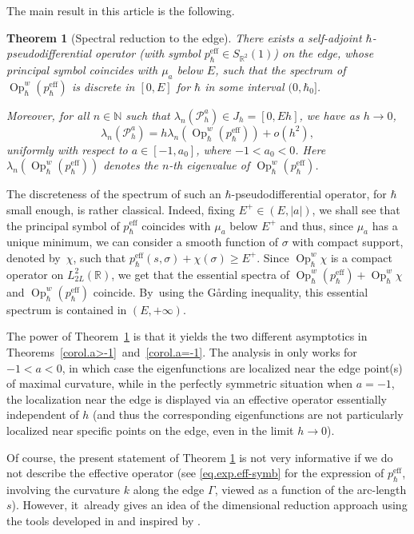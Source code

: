 \documentclass[JEP,XML,SOM,Unicode,NoFloatCountersInSection,published]{cedram}
\newcommand{\eff}{\mathrm{eff}}
\DeclareMathOperator{\Op}{Op}
\newcommand{\cP}{\mathcal{P}}
\theoremstyle{plain}
\newtheorem{theorem}{Theorem}[section]
\theoremstyle{definition}
\newcommand{\R}{\mathbb{R}}
\newcommand{\N}{\mathbb{N}}
\begin{document}
\pagebreak[2]
The main result in this article is the following.

\begin{theorem}[Spectral reduction to the edge]\label{thm.main}
There exists a self-adjoint $\hbar$\nobreakdash-pseudo\-differential operator (with symbol $p_\hbar^{\eff}\in S_{\R^2}(1)$) on the edge, whose principal symbol coincides with $\mu_a$ below $E$, such that the spectrum of $\Op^w_\hbar (p^{\eff}_\hbar)$ is discrete in $[0,E]$ for $\hbar$ in some interval $(0,\hbar_0]$.

Moreover, for all $n\in\N$ such that $\lambda_n(\cP_h^a)\in J_h=[0,Eh]$, we have as $h\to0$,
\[
\lambda_n(\cP^a_h)= h\lambda_n(\Op^w_\hbar (p^{\eff}_\hbar))+o(h^{2}),
\]
uniformly with respect to $a\in[-1,a_0]$, where $-1<a_0<0$. Here $\lambda_n(\Op^w_\hbar (p^{\eff}_\hbar))$ denotes the $n$-th eigenvalue of $\Op^w_\hbar (p^{\eff}_\hbar)$.
\end{theorem}
The discreteness of the spectrum of such an $\hbar$-pseudodifferential operator, for $\hbar$ small enough, is rather classical. Indeed, fixing $E^+\in(E,|a|)$, we shall see that the principal symbol of $p_\hbar^{\eff}$ coincides with $\mu_a$ below $E^+$ and thus, since $\mu_a$ has a unique minimum, we can consider a smooth function of $\sigma$ with compact support, denoted by~$\chi$, such that $p_\hbar^{\eff}(s,\sigma)+\chi(\sigma)\geq E^+$. Since $\Op^w_\hbar \chi$ is a compact operator on $L^2_{2L}(\R)$, we get that the essential spectra of $\Op^w_\hbar (p^{\eff}_\hbar)+\Op^w_\hbar \chi$ and $\Op^w_\hbar (p^{\eff}_\hbar)$ coincide. By~using the G\aa rding inequality, this essential spectrum is contained in $ (E,+\infty)$.

The power of Theorem~\ref{thm.main} is that it yields the two different asymptotics in Theorems~\ref{corol.a>-1}~and~\ref{corol.a=-1}. The analysis in \cite{AHK} only works for $-1<a<0$, in which case the eigenfunctions are localized near the edge point(s) of maximal curvature, while in the perfectly symmetric situation when $a=-1$, the localization near the edge is displayed via an effective operator essentially independent of $h$ (and thus the corresponding eigenfunctions are not particularly localized near specific points on the edge, even in the limit $h\to 0$).

Of course, the present statement of Theorem \ref{thm.main} is not very informative if we do not describe the effective operator (see \eqref{eq.exp.eff-symb} for the expression of $p_\hbar^{\eff}$, involving the curvature $k$ along the edge $\Gamma$, viewed as a function of the arc-length $s$). However, it~\hbox{already} gives an idea of the dimensional reduction approach using the tools developed in \cite{Keraval} and inspired by \cite{GMS91, M07}.
\end{document}
